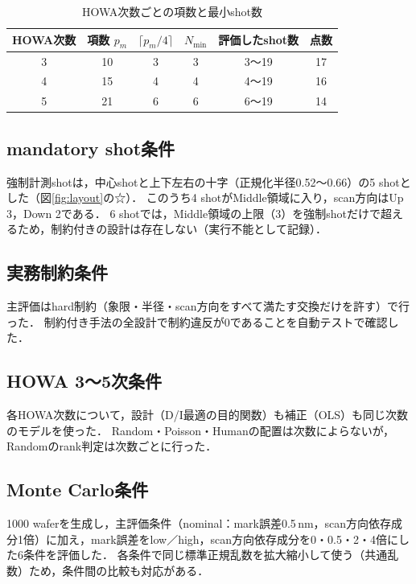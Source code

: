 \documentclass[10.5pt,a4paper]{ltjsarticle}
\begin{document}
\begin{table}[htbp]
  \centering
  \caption{HOWA次数ごとの項数と最小shot数}
  \label{tab:nmin}
  \begin{tabular}{cccccc}
    \toprule
    HOWA次数 & 項数 $p_m$ & $\lceil p_m/4\rceil$ & $N_\text{min}$ & 評価したshot数 & 点数 \\
    \midrule
    3 & 10 & 3 & 3 & 3〜19 & 17 \\
    4 & 15 & 4 & 4 & 4〜19 & 16 \\
    5 & 21 & 6 & 6 & 6〜19 & 14 \\
    \bottomrule
  \end{tabular}
\end{table}

\subsection{mandatory shot条件}

強制計測shotは，中心shotと上下左右の十字（正規化半径0.52〜0.66）の5 shotとした（図\ref{fig:layout}の☆）．
このうち4 shotがMiddle領域に入り，scan方向はUp 3，Down 2である．
6 shotでは，Middle領域の上限（3）を強制shotだけで超えるため，制約付きの設計は存在しない（実行不能として記録）．

\subsection{実務制約条件}

主評価はhard制約（象限・半径・scan方向をすべて満たす交換だけを許す）で行った．
制約付き手法の全設計で制約違反が0であることを自動テストで確認した．

\subsection{HOWA 3〜5次条件}

各HOWA次数について，設計（D/I最適の目的関数）も補正（OLS）も同じ次数のモデルを使った．
Random・Poisson・Humanの配置は次数によらないが，Randomのrank判定は次数ごとに行った．

\subsection{Monte Carlo条件}

1000 waferを生成し，主評価条件（nominal：mark誤差0.5\,nm，scan方向依存成分1倍）に加え，mark誤差をlow／high，scan方向依存成分を0・0.5・2・4倍にした6条件を評価した．
各条件で同じ標準正規乱数を拡大縮小して使う（共通乱数）ため，条件間の比較も対応がある．
\end{document}
